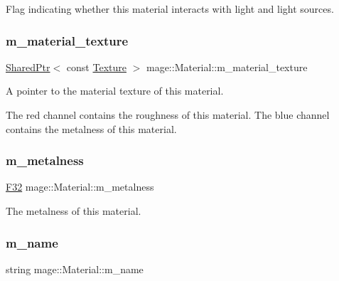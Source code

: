 Flag indicating whether this material interacts with light and light sources. \hypertarget{classmage_1_1_material_aedd606b3cc103ba756aaca9433da0794}{}\label{classmage_1_1_material_aedd606b3cc103ba756aaca9433da0794} 
\subsubsection{\texorpdfstring{m\+\_\+material\+\_\+texture}{m\_material\_texture}}
{\footnotesize\ttfamily \hyperlink{namespacemage_a1e01ae66713838a7a67d30e44c67703e}{Shared\+Ptr}$<$ const \hyperlink{classmage_1_1_texture}{Texture} $>$ mage\+::\+Material\+::m\+\_\+material\+\_\+texture\hspace{0.3cm}{\ttfamily [private]}}

A pointer to the material texture of this material.

The red channel contains the roughness of this material. The blue channel contains the metalness of this material. \hypertarget{classmage_1_1_material_a40b4b6c0e7b940bdf3764b21cb16fbfb}{}\label{classmage_1_1_material_a40b4b6c0e7b940bdf3764b21cb16fbfb} 
\subsubsection{\texorpdfstring{m\+\_\+metalness}{m\_metalness}}
{\footnotesize\ttfamily \hyperlink{namespacemage_aa97e833b45f06d60a0a9c4fc22ae02c0}{F32} mage\+::\+Material\+::m\+\_\+metalness\hspace{0.3cm}{\ttfamily [private]}}

The metalness of this material. \hypertarget{classmage_1_1_material_a2b3e839a8ae093d53b12529d61ec6605}{}\label{classmage_1_1_material_a2b3e839a8ae093d53b12529d61ec6605} 
\subsubsection{\texorpdfstring{m\+\_\+name}{m\_name}}
{\footnotesize\ttfamily string mage\+::\+Material\+::m\+\_\+name\hspace{0.3cm}{\ttfamily [private]}}

